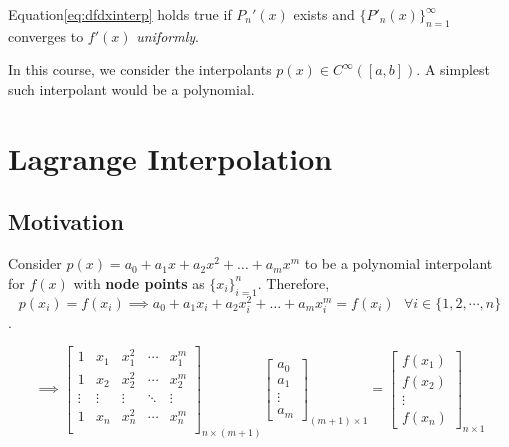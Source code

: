 \documentclass[
]{book}
\begin{document}
Equation\eqref{eq:dfdxinterp} holds true if \(P_n'(x)\) exists and \(\{P'_n(x)\}_{n=1}^{\infty}\) converges to \(f'(x)\) \emph{uniformly}.

In this course, we consider the interpolants \(p(x) \in C^{\infty}([a,b])\). A simplest such interpolant would be a polynomial.

\hypertarget{lagrange-interpolation}{%
\section{Lagrange Interpolation}\label{lagrange-interpolation}}

\hypertarget{motivation}{%
\subsection{Motivation}\label{motivation}}

Consider \(p(x) = a_0+a_1x+a_2x^2+\dots+ a_mx^m\) to be a polynomial interpolant for \(f(x)\) with \textbf{node points} as \(\{x_i\}_{i=1}^n\). Therefore,
\[p(x_i)=f(x_i) \implies a_0+a_1x_i+a_2x_i^2+\dots+ a_mx_i^m = f(x_i) \ \ \ \forall i \in \{1,2,\cdots, n\}\].

\begin{equation}
\implies \begin{bmatrix}
1 & x_1 & x_1^2 & \cdots & x_1^m\\
1 & x_2 & x_2^2 & \cdots & x_2^m\\
\vdots & \vdots & \vdots & \ddots & \vdots \\
1 & x_n & x_n^2 & \cdots & x_n^m\\
\end{bmatrix}_{n \times(m+1)} \begin{bmatrix}a_0\\a_1\\ \vdots \\a_m \end{bmatrix}_{(m+1) \times 1}  = \begin{bmatrix} f(x_1)\\f(x_2)\\ \vdots \\f(x_n) \end{bmatrix}_{n\times 1}
\end{equation}
\end{document}

